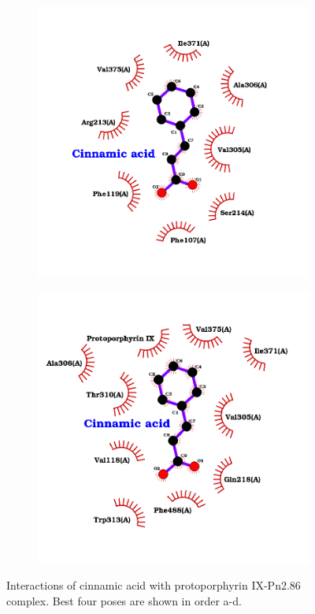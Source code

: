 \documentclass[12pt]{article}
\begin{document}
\begin{figure}[H]
\begin{subfigure}[H]{0.35\textwidth}
			\caption{}
		\end{subfigure}
		\hfill
		\begin{subfigure}[H]{0.35\textwidth}
			\hspace{2cm}
			\includegraphics[width=\textwidth]{../2/Dock/Dock2/best3.png}
			\caption{}
		\end{subfigure}
		\hfill
		\begin{subfigure}[H]{0.35\textwidth}
			\hspace{-2cm}
			\includegraphics[width=\textwidth]{../2/Dock/Dock2/best4.png}
			\caption{}
		\end{subfigure}
		\hfill
		\caption[Interactions of cinnamic acid with protoporphyrin IX-Pn2.86 complex]{Interactions of cinnamic acid with protoporphyrin IX-Pn2.86 complex. Best four poses are shown in order a-d.}
		\label{fig2_5}
	\end{figure}
\end{document}
